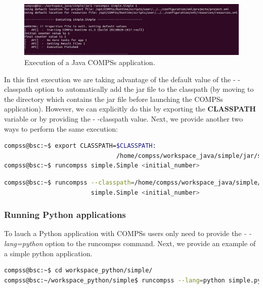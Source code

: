\begin{figure}[h!]
  \centering
    \includegraphics[width=\textwidth]{./Sections/2_Execution/Figures/java_execution.jpeg}
    \caption{Execution of a Java COMPSs application.}
    \label{fig:java_execution}
\end{figure}
\vspace{-0.4cm}

In this first execution we are taking advantage of the default value of the - -classpath option to automatically add the jar
file to the classpath (by moving to the directory which contains the jar file before launching the COMPSs application). However,
we can explicitly do this by exporting the \textbf{CLASSPATH} variable or by providing the 
- -classpath value. Next, we provide another two ways to perform the same execution:

\begin{lstlisting}[language=bash]
compss@bsc:~$ export CLASSPATH=$CLASSPATH:
                               /home/compss/workspace_java/simple/jar/simple.jar
compss@bsc:~$ runcompss simple.Simple <initial_number>
\end{lstlisting}

\begin{lstlisting}[language=bash]
compss@bsc:~$ runcompss --classpath=/home/compss/workspace_java/simple/jar/simple.jar 
                        simple.Simple <initial_number>
\end{lstlisting}


\subsubsection{Running Python applications}
To lauch a Python application with COMPSs users only need to provide the \textit{- -lang=python} option to the runcompss command. 
Next, we provide an example of a simple python application.

\begin{lstlisting}[language=bash]
compss@bsc:~$ cd workspace_python/simple/
compss@bsc:~/workspace_python/simple$ runcompss --lang=python simple.py <initial_number>
\end{lstlisting}

